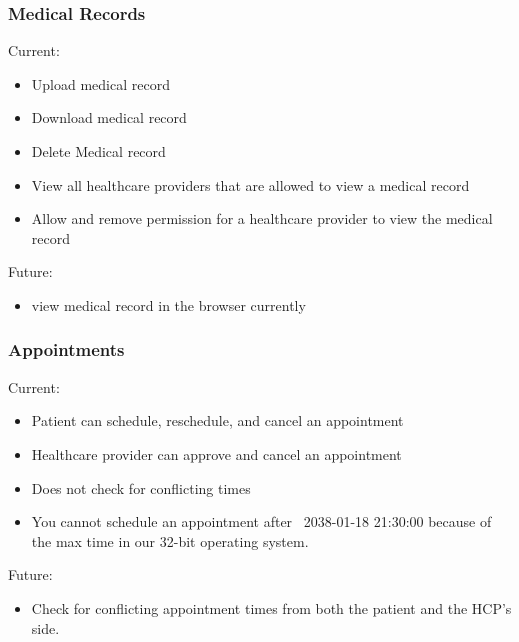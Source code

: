 \subsubsection{Medical Records}
Current: 
\begin{itemize}
\item Upload medical record
\item Download medical record
\item Delete Medical record
\item View all healthcare providers that are allowed to view a medical record
\item Allow and remove permission for a healthcare provider to view the medical record
\end{itemize}
Future:
\begin{itemize}
\item view medical record in the browser currently 
\end{itemize}

\subsubsection{Appointments}
Current: 
\begin{itemize}
\item Patient can schedule, reschedule, and cancel an appointment
\item Healthcare provider can approve and cancel an appointment
\item Does not check for conflicting times 
\item You cannot schedule an appointment after ~2038-01-18 21:30:00 because of the max time in our 32-bit operating system. 
\end{itemize}
Future: 
\begin{itemize}
\item Check for conflicting appointment times from both the patient and the HCP's side. 
\end{itemize}


